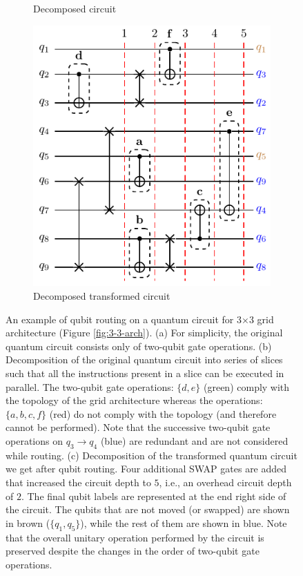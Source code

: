 \documentclass[%
 reprint,
amsmath,amssymb,showkeys,
pra,
]{revtex4-2}
\begin{document}
\begin{figure}[t]
\begin{subfigure}[b]{0.30\linewidth}
        \caption{Decomposed circuit\label{fig:sliced_circ}}
    \end{subfigure}
    \begin{subfigure}[b]{0.33\linewidth}
        \includegraphics[width=\textwidth]{images/transformed_circ.pdf}
        \caption{Decomposed transformed circuit\label{fig:transformed_circ}}
    \end{subfigure}
    \caption{An example of qubit routing on a quantum circuit for 3$\times$3 grid architecture (Figure \ref{fig:3-3-arch}). (a) For simplicity, the original quantum circuit consists only of two-qubit gate operations. (b) Decomposition of the original quantum circuit into series of slices such that all the instructions present in a slice can be executed in parallel. The two-qubit gate operations: $\{d,e\}$ (green) comply with the topology of the grid architecture whereas the operations: $\{a, b, c, f\}$ (red) do not comply with the topology (and therefore cannot be performed). Note that the successive two-qubit gate operations on $q_3\rightarrow q_4$ (blue) are redundant and are not considered while routing. (c) Decomposition of the transformed quantum circuit we get after qubit routing. Four additional SWAP gates are added that increased the circuit depth to $5$, i.e., an overhead circuit depth of $2$. The final qubit labels are represented at the end right side of the circuit. The qubits that are not moved (or swapped) are shown in brown ($\{q_1, q_5\}$), while the rest of them are shown in blue. Note that the overall unitary operation performed by the circuit is preserved despite the changes in the order of two-qubit gate operations.}
    \label{fig:routing-example}
\end{figure}
\end{document}
